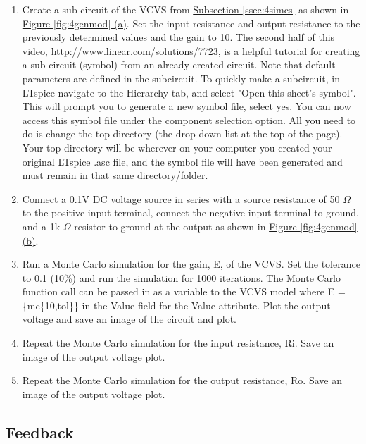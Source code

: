 \begin{enumerate}
	\item Create a sub-circuit of the VCVS from \hyperref[ssec:4simcs]{Subsection \ref*{ssec:4simcs}} as shown in \hyperref[fig:4genmod]{Figure \ref*{fig:4genmod} (a)}. Set the input resistance and output resistance to the previously determined values and the gain to 10. The second half of this video, \url{http://www.linear.com/solutions/7723}, is a helpful tutorial for creating a sub-circuit (symbol) from an already created circuit. Note that default parameters are defined in the subcircuit. To quickly make a subcircuit, in LTspice navigate to the Hierarchy tab, and select "Open this sheet's symbol". This will prompt you to generate a new symbol file, select yes. You can now access this symbol file under the component selection option. All you need to do is change the top directory (the drop down list at the top of the page). Your top directory will be wherever on your computer you created your original LTspice .asc file, and the symbol file will have been generated and must remain in that same directory/folder.
	\item Connect a 0.1V DC voltage source in series with a source resistance of 50 $\Omega$ to the positive input terminal, connect the negative input terminal to ground, and a 1k $\Omega$ resistor to ground at the output as shown in \hyperref[fig:4genmod]{Figure \ref*{fig:4genmod} (b)}.
	\item Run a Monte Carlo simulation for the gain, E, of the VCVS. Set the tolerance to 0.1 (10\%) and run the simulation for 1000 iterations. The Monte Carlo function call can be passed in as a variable to the VCVS model where E = \{mc\{10,tol\}\} in the Value field for the Value attribute. Plot the output voltage and save an image of the circuit and plot. \label{itm:4ssec2itm3}
	\item Repeat the Monte Carlo simulation for the input resistance, Ri. Save an image of the output voltage plot. \label{itm:4ssec2itm4}
	\item Repeat the Monte Carlo simulation for the output resistance, Ro. Save an image of the output voltage plot. \label{itm:4ssec2itm5}
\end{enumerate}

\subsection{Feedback} \label{ssec:4Feedback}

